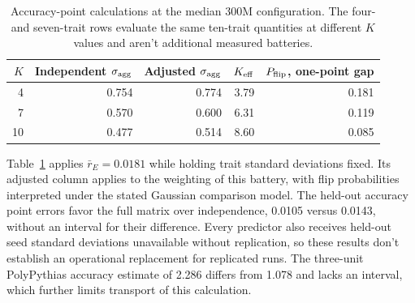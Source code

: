 \begin{table}[htbp]
\centering\small
\caption{Accuracy-point calculations at the median 300M configuration. The four- and seven-trait rows evaluate the same ten-trait quantities at different $K$ values and aren't additional measured batteries.}
\label{tab:original8}
\begin{tabular}{rrrrr}\hline
$K$ & Independent $\sigma_{\rm agg}$ & Adjusted $\sigma_{\rm agg}$ & $K_{\rm eff}$ & $P_{\rm flip}$, one-point gap\\\hline
4 & 0.754 & 0.774 & 3.79 & 0.181\\
7 & 0.570 & 0.600 & 6.31 & 0.119\\
10 & 0.477 & 0.514 & 8.60 & 0.085\\\hline
\end{tabular}
\end{table}

Table~\ref{tab:original8} applies $\bar r_E=0.0181$ while holding trait standard deviations fixed. Its adjusted column applies to the weighting of this battery, with flip probabilities interpreted under the stated Gaussian comparison model. The held-out accuracy point errors favor the full matrix over independence, 0.0105 versus 0.0143, without an interval for their difference. Every predictor also receives held-out seed standard deviations unavailable without replication, so these results don't establish an operational replacement for replicated runs. The three-unit PolyPythias accuracy estimate of 2.286 differs from 1.078 and lacks an interval, which further limits transport of this calculation.

